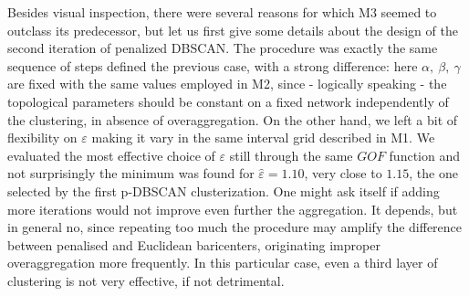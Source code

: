 \documentclass[11pt,twoside]{report}
\begin{document}
Besides visual inspection, there were several reasons for which M3 seemed to outclass its predecessor, but let us first give some details about the design of the second iteration of penalized DBSCAN. The procedure was exactly the same sequence of steps defined the previous case, with a strong difference: here $ \alpha,\ \beta,\ \gamma $ are fixed with the same values employed in M2, since - logically speaking - the topological parameters should be constant on a fixed network independently of the clustering, in absence of overaggregation. On the other hand, we left a bit of flexibility on $ \varepsilon $ making it vary in the same interval grid described in M1. We evaluated the most effective choice of $ \varepsilon $ still through the same $ GOF $ function and not surprisingly the minimum was found for $ \hat{\varepsilon}=1.10 $, very close to $ 1.15 $, the one selected by the first p-DBSCAN clusterization. One might ask itself if adding more iterations would not improve even further the aggregation. It depends, but in general no, since repeating too much the procedure may amplify the difference between penalised and Euclidean baricenters, originating improper overaggregation more frequently. In this particular case, even a third layer of clustering is not very effective, if not detrimental.
\end{document}
